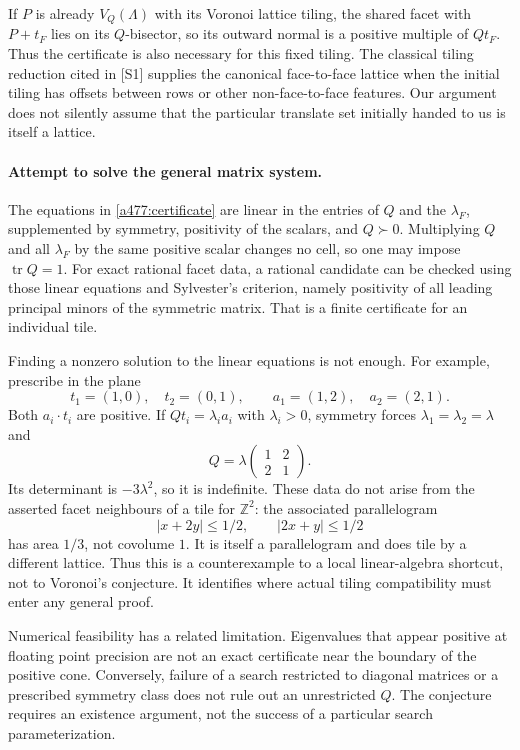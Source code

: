 \documentclass[11pt]{article}
\begin{document}
If $P$ is already $V_Q(\Lambda)$ with its Voronoi lattice tiling, the
shared facet with $P+t_F$ lies on its $Q$-bisector, so its outward
normal is a positive multiple of $Qt_F$. Thus the certificate is also
necessary for this fixed tiling. The classical tiling reduction cited
in [S1] supplies the canonical face-to-face lattice when the initial
tiling has offsets between rows or other non-face-to-face features.
Our argument does not silently assume that the particular translate set
initially handed to us is itself a lattice.

\paragraph{Attempt to solve the general matrix system.}
The equations in \eqref{a477:certificate} are linear in the entries of
$Q$ and the $\lambda_F$, supplemented by symmetry, positivity of the
scalars, and $Q\succ0$. Multiplying $Q$ and all $\lambda_F$ by the
same positive scalar changes no cell, so one may impose
$\operatorname{tr}Q=1$. For exact rational facet data, a rational
candidate can be checked using those linear equations and Sylvester's
criterion, namely positivity of all leading principal minors of the
symmetric matrix. That is a finite certificate for an individual tile.

Finding a nonzero solution to the linear equations is not enough.
For example, prescribe in the plane
\[
 t_1=(1,0),\quad t_2=(0,1),\qquad
 a_1=(1,2),\quad a_2=(2,1).
\]
Both $a_i\cdot t_i$ are positive. If $Qt_i=\lambda_i a_i$ with
$\lambda_i>0$, symmetry forces $\lambda_1=\lambda_2=\lambda$ and
\[
                   Q=\lambda\begin{pmatrix}1&2\\2&1\end{pmatrix}.
\]
Its determinant is $-3\lambda^2$, so it is indefinite. These data do
not arise from the asserted facet neighbours of a tile for
$\mathbb Z^2$: the associated parallelogram
\[
          |x+2y|\le1/2,\qquad|2x+y|\le1/2
\]
has area $1/3$, not covolume $1$. It is itself a parallelogram and
does tile by a different lattice. Thus this is a counterexample to a
local linear-algebra shortcut, not to Voronoi's conjecture. It identifies
where actual tiling compatibility must enter any general proof.

Numerical feasibility has a related limitation. Eigenvalues that appear
positive at floating point precision are not an exact certificate near
the boundary of the positive cone. Conversely, failure of a search
restricted to diagonal matrices or a prescribed symmetry class does not
rule out an unrestricted $Q$. The conjecture requires an existence
argument, not the success of a particular search parameterization.
\end{document}
